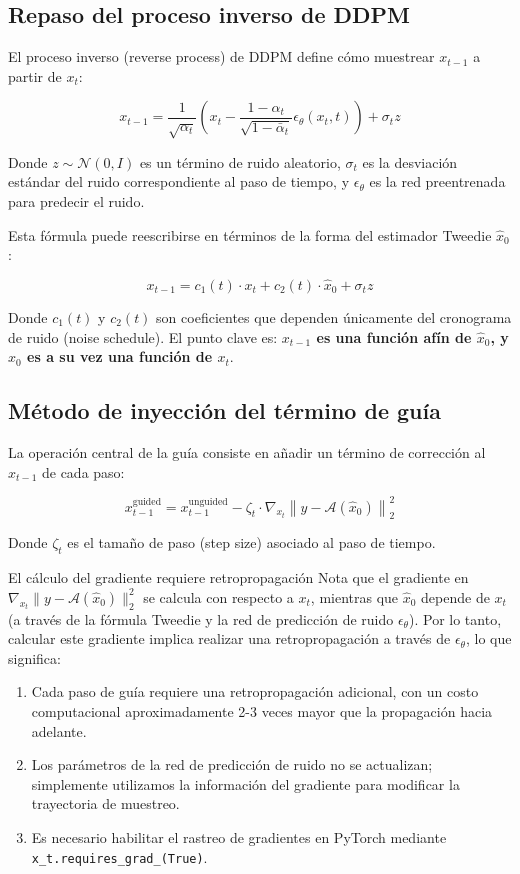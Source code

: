 \documentclass[a4paper]{article}
\begin{document}
\subsection{Repaso del proceso inverso de DDPM}

El proceso inverso (reverse process) de DDPM define cómo muestrear $x_{t-1}$ a partir de $x_t$:

$$
x_{t-1} = \frac{1}{\sqrt{\alpha_t}} \left( x_t - \frac{1-\alpha_t}{\sqrt{1-\bar{\alpha}_t}} \epsilon_\theta(x_t, t) \right) + \sigma_t z
$$

Donde $z \sim \mathcal{N}(0, I)$ es un término de ruido aleatorio, $\sigma_t$ es la desviación estándar del ruido correspondiente al paso de tiempo, y $\epsilon_\theta$ es la red preentrenada para predecir el ruido.

Esta fórmula puede reescribirse en términos de la forma del estimador Tweedie $\hat{x}_0$:

$$
x_{t-1} = c_1(t) \cdot x_t + c_2(t) \cdot \hat{x}_0 + \sigma_t z
$$

Donde $c_1(t)$ y $c_2(t)$ son coeficientes que dependen únicamente del cronograma de ruido (noise schedule). El punto clave es: \textbf{$x_{t-1}$ es una función afín de $\hat{x}_0$, y $\hat{x}_0$ es a su vez una función de $x_t$}.

\subsection{Método de inyección del término de guía}

La operación central de la guía consiste en añadir un término de corrección al $x_{t-1}$ de cada paso:

$$
x_{t-1}^{\text{guided}} = x_{t-1}^{\text{unguided}} - \zeta_t \cdot \nabla_{x_t} \left\| y - \mathcal{A}(\hat{x}_0) \right\|_2^2
$$

Donde $\zeta_t$ es el tamaño de paso (step size) asociado al paso de tiempo.

\begin{warningbox}{El cálculo del gradiente requiere retropropagación}
Nota que el gradiente en $\nabla_{x_t} \| y - \mathcal{A}(\hat{x}_0) \|_2^2$ se calcula con respecto a $x_t$, mientras que $\hat{x}_0$ depende de $x_t$ (a través de la fórmula Tweedie y la red de predicción de ruido $\epsilon_\theta$). Por lo tanto, calcular este gradiente implica realizar una retropropagación a través de $\epsilon_\theta$, lo que significa:
\begin{enumerate}
    \item Cada paso de guía requiere una retropropagación adicional, con un costo computacional aproximadamente 2-3 veces mayor que la propagación hacia adelante.
    \item Los parámetros de la red de predicción de ruido no se actualizan; simplemente utilizamos la información del gradiente para modificar la trayectoria de muestreo.
    \item Es necesario habilitar el rastreo de gradientes en PyTorch mediante \texttt{x\_t.requires\_grad\_(True)}.
\end{enumerate}
\end{warningbox}
\end{document}
